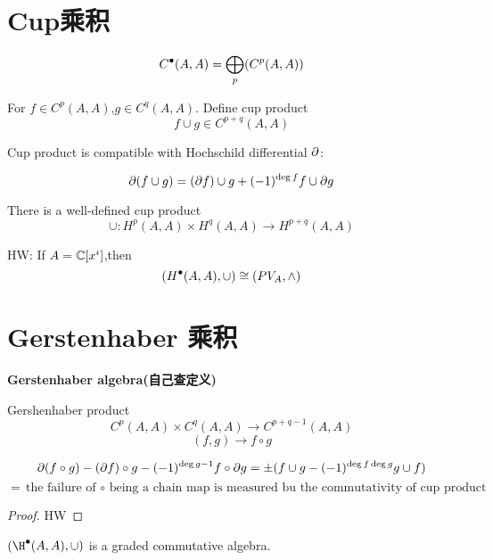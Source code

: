 \section{Cup乘积}

$$C^{\bullet}(A,A)=\bigoplus_p(C^p(A,A))$$


\begin{definition}
For $f\in C^p(A,A)$,$g\in C^q(A,A)$. Define cup product
$$f\cup g\in C^{p+q}(A,A)$$
\end{definition}

\begin{prop}
Cup product is compatible with Hochschild differential $\partial$:

$$\partial(f\cup g)=(\partial f)\cup g+(-1)^{\deg f}f\cup\partial g$$
\end{prop}


\begin{cor}
There is a well-defined cup product
$$\cup: H^p(A,A)\times H^{q}(A,A)\to H^{p+q}(A,A)$$
\end{cor}

HW: If $A=\mathbb{C}[x^i]$,then
$$(H^{\bullet}(A,A),\cup)\cong (PV_A,\wedge)$$

\section{Gerstenhaber 乘积}
\textbf{Gerstenhaber algebra(自己查定义)}

\begin{definition}Gershenhaber product
$$C^{p}(A,A)\times C^q(A,A)\to C^{p+q-1}(A,A)$$
$$(f,g)\to f\circ g$$

\end{definition}

\begin{prop}
$$\partial(f\circ g)-(\partial f)\circ g-(-1)^{\deg g-1}f\circ\partial g
=\pm(f\cup g-(-1)^{\deg f\deg g}g\cup f)$$
$$=\text{the failure of $\circ$ being a chain map
is measured bu the commutativity of cup product}$$
\end{prop}

\begin{proof}
HW
\end{proof}

\begin{cor}
$(\H\updot(A,A),\cup)$ is a graded commutative algebra.
\end{cor}

